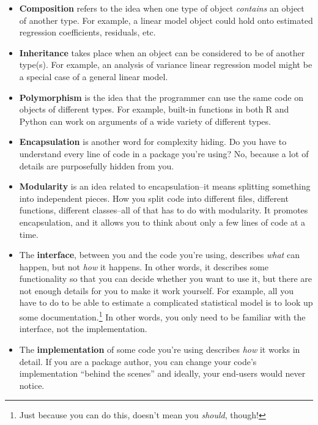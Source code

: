 \documentclass[
  12pt,
  krantz2]{krantz}
\begin{document}
\begin{itemize}
\item
  \textbf{Composition} refers to the idea when one type of object \emph{contains} an object of another type. For example, a linear model object could hold onto estimated regression coefficients, residuals, etc.
\item
  \textbf{Inheritance} takes place when an object can be considered to be of another type(s). For example, an analysis of variance linear regression model might be a special case of a general linear model.
\item
  \textbf{Polymorphism} is the idea that the programmer can use the same code on objects of different types. For example, built-in functions in both R and Python can work on arguments of a wide variety of different types.
\item
  \textbf{Encapsulation} is another word for complexity hiding. Do you have to understand every line of code in a package you're using? No, because a lot of details are purposefully hidden from you.
\item
  \textbf{Modularity} is an idea related to encapsulation--it means splitting something into independent pieces. How you split code into different files, different functions, different classes--all of that has to do with modularity. It promotes encapsulation, and it allows you to think about only a few lines of code at a time.
\item
  The \textbf{interface}, between you and the code you're using, describes \emph{what} can happen, but not \emph{how} it happens. In other words, it describes some functionality so that you can decide whether you want to use it, but there are not enough details for you to make it work yourself. For example, all you have to do to be able to estimate a complicated statistical model is to look up some documentation.\footnote{Just because you can do this, doesn't mean you \emph{should}, though!} In other words, you only need to be familiar with the interface, not the implementation.
\item
  The \textbf{implementation} of some code you're using describes \emph{how} it works in detail. If you are a package author, you can change your code's implementation ``behind the scenes'' and ideally, your end-users would never notice.
\end{itemize}
\end{document}
